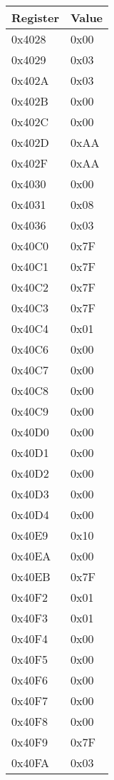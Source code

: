 \begin{tabular}{ll}
Register & Value \\
\hline
\hline
0x4028 & 0x00 \\
0x4029 & 0x03 \\
0x402A & 0x03 \\
0x402B & 0x00 \\
0x402C & 0x00 \\
0x402D & 0xAA \\
0x402F & 0xAA \\
0x4030 & 0x00 \\
0x4031 & 0x08 \\
0x4036 & 0x03 \\
0x40C0 & 0x7F \\
0x40C1 & 0x7F \\
0x40C2 & 0x7F \\
0x40C3 & 0x7F \\
0x40C4 & 0x01 \\
0x40C6 & 0x00 \\
0x40C7 & 0x00 \\
0x40C8 & 0x00 \\
0x40C9 & 0x00 \\
0x40D0 & 0x00 \\
0x40D1 & 0x00 \\
0x40D2 & 0x00 \\
0x40D3 & 0x00 \\
0x40D4 & 0x00 \\
0x40E9 & 0x10 \\
0x40EA & 0x00 \\
0x40EB & 0x7F \\
0x40F2 & 0x01 \\
0x40F3 & 0x01 \\
0x40F4 & 0x00 \\
0x40F5 & 0x00 \\
0x40F6 & 0x00 \\
0x40F7 & 0x00 \\
0x40F8 & 0x00 \\
0x40F9 & 0x7F \\
0x40FA & 0x03 \\
\hline
\end{tabular}